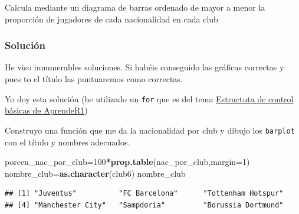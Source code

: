 \documentclass[]{article}
\newenvironment{Shaded}{\begin{snugshade}}{\end{snugshade}}
\newcommand{\CharTok}[1]{\textcolor[rgb]{0.31,0.60,0.02}{#1}}
\newcommand{\ControlFlowTok}[1]{\textcolor[rgb]{0.13,0.29,0.53}{\textbf{#1}}}
\newcommand{\DataTypeTok}[1]{\textcolor[rgb]{0.13,0.29,0.53}{#1}}
\newcommand{\DecValTok}[1]{\textcolor[rgb]{0.00,0.00,0.81}{#1}}
\newcommand{\FloatTok}[1]{\textcolor[rgb]{0.00,0.00,0.81}{#1}}
\newcommand{\KeywordTok}[1]{\textcolor[rgb]{0.13,0.29,0.53}{\textbf{#1}}}
\newcommand{\NormalTok}[1]{#1}
\newcommand{\OperatorTok}[1]{\textcolor[rgb]{0.81,0.36,0.00}{\textbf{#1}}}
\newcommand{\OtherTok}[1]{\textcolor[rgb]{0.56,0.35,0.01}{#1}}
\newcommand{\StringTok}[1]{\textcolor[rgb]{0.31,0.60,0.02}{#1}}
\begin{document}
Calcula mediante un diagrama de barras ordenado de mayor a menor la
proporción de jugadores de cada nacionalidad en cada club

\hypertarget{soluciuxf3n-6}{%
\subsubsection{Solución}\label{soluciuxf3n-6}}

He viso innumerables soluciones. Si habéis conseguido las gráficas
correctas y pues to el título las puntuaremos como correctas.

Yo doy esta solución (he utilizado un \texttt{for} que es del tema
\href{https://aprender-uib.github.io/AprendeR1/chap-for.html}{Estructuta
de control básicas de AprendeR1})

Construyo una función que me da la nacionalidad por club y dibujo los
\texttt{barplot} con el título y nombres adecuados.

\begin{Shaded}
\begin{Highlighting}[]
\NormalTok{porcen_nac_por_club=}\DecValTok{100}\OperatorTok{*}\KeywordTok{prop.table}\NormalTok{(nac_por_club,}\DataTypeTok{margin=}\DecValTok{1}\NormalTok{)}
\NormalTok{nombre_club=}\KeywordTok{as.character}\NormalTok{(club6)}
\NormalTok{nombre_club}
\end{Highlighting}
\end{Shaded}

\begin{verbatim}
## [1] "Juventus"          "FC Barcelona"      "Tottenham Hotspur"
## [4] "Manchester City"   "Sampdoria"         "Borussia Dortmund"
\end{verbatim}

\begin{Shaded}
\end{Shaded}
\end{document}
